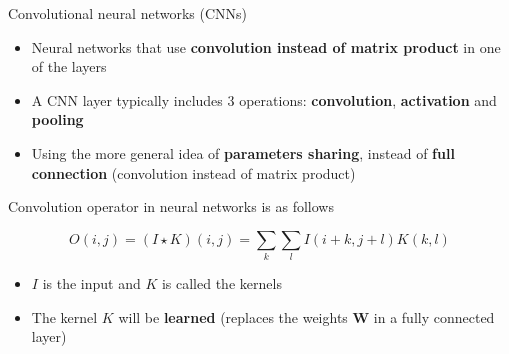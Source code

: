 \begin{frame}{Convolutional neural networks (CNNs)}
	\begin{itemize}
		\item Neural networks that use \textbf{convolution instead of matrix product} in one of the layers

		\medskip

		\item A CNN layer typically includes 3 operations: \textbf{convolution}, \textbf{activation} and \textbf{pooling}

		\medskip

		\item Using the more general idea of \textbf{parameters sharing}, instead of \textbf{full connection} (convolution instead of matrix product)
	\end{itemize}

	\bigskip

	Convolution operator in neural networks is as follows

	\begin{equation*}
		O(i, j) = (I \star K)(i, j) = \sum_{k} \sum_{l} I(i + k, j + l) K(k, l)
	\end{equation*}
	\begin{itemize}
		\item $I$ is the input and $K$ is called the kernels
		\item The kernel $K$ will be \textbf{learned} (replaces the weights $\mathbf{W}$ in a fully connected layer)
	\end{itemize}
\end{frame}

